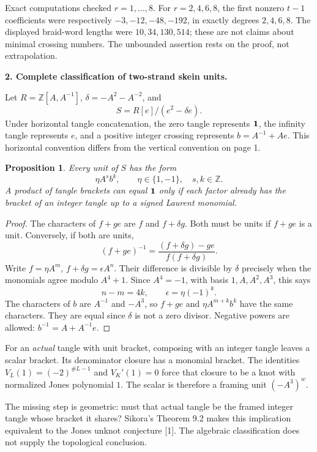 \documentclass[10pt]{article}
\newtheorem{prop}{Proposition}
\newcommand{\Z}{\mathbb Z}\newcommand{\Q}{\mathbb Q}
\begin{document}
Exact computations checked \(r=1,\ldots,8\). For \(r=2,4,6,8\), the first nonzero
\(t-1\) coefficients were respectively \(-3,-12,-48,-192\), in exactly degrees
\(2,4,6,8\). The displayed braid-word lengths were \(10,34,130,514\); these are
not claims about minimal crossing numbers. The unbounded assertion rests on
the proof, not extrapolation.

\newpage
\textbf{2. Complete classification of two-strand skein units.}

Let \(R=\Z[A,A^{-1}]\), \(\delta=-A^2-A^{-2}\), and
\[
 S=R[e]/(e^2-\delta e).
\]
Under horizontal tangle concatenation, the zero tangle represents \(\mathbf 1\), the
infinity tangle represents \(e\), and a positive integer crossing represents
\(b=A^{-1}+Ae\). This horizontal convention differs from the vertical convention
on page 1.

\begin{prop}
Every unit of \(S\) has the form
\[
 \eta A^s b^k,\qquad \eta\in\{1,-1\},\quad s,k\in\Z.
\]
A product of tangle brackets can equal \(\mathbf 1\) only if each factor already has
the bracket of an integer tangle up to a signed Laurent monomial.
\end{prop}
\begin{proof}
The characters of \(f+ge\) are \(f\) and \(f+\delta g\).
Both must be units if \(f+ge\) is a unit. Conversely, if both are units,
\[
 (f+ge)^{-1}=\frac{(f+\delta g)-ge}{f(f+\delta g)}.
\]
Write \(f=\eta A^m\), \(f+\delta g=\epsilon A^n\).
Their difference is divisible by \(\delta\) precisely when the monomials agree
modulo \(A^4+1\). Since \(A^4=-1\), with basis \(1,A,A^2,A^3\), this says
\[
 n-m=4k,\qquad \epsilon=\eta(-1)^k.
\]
The characters of \(b\) are \(A^{-1}\) and \(-A^3\), so \(f+ge\) and
\(\eta A^{m+k}b^k\) have the same characters. They are equal since \(\delta\)
is not a zero divisor. Negative powers are allowed:
\(b^{-1}=A+A^{-1}e\).
\end{proof}

For an \emph{actual} tangle with unit bracket, composing with an integer tangle
leaves a scalar bracket. Its denominator closure has a monomial bracket.
The identities \(V_L(1)=(-2)^{\#L-1}\) and \(V_K'(1)=0\) force that closure to
be a knot with normalized Jones polynomial \(1\). The scalar is therefore
a framing unit \((-A^3)^w\).

The missing step is geometric: must that actual tangle be the framed integer
tangle whose bracket it shares? Sikora's Theorem 9.2 makes this implication
equivalent to the Jones unknot conjecture [1]. The algebraic classification
does not supply the topological conclusion.
\end{document}
